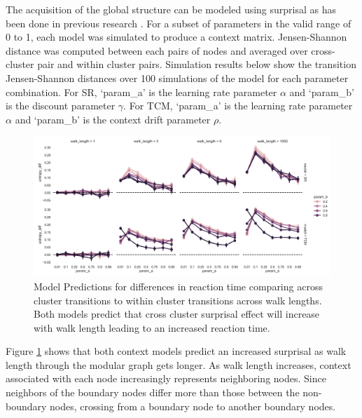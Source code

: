 The acquisition of the global structure can be modeled using surprisal as has been done in previous research \cite{lynn2020abstract,lynn2020humans,lynn2020human}. For a subset of parameters in the valid range of 0 to 1, each model was simulated to produce a context matrix. Jensen-Shannon distance was computed between each pairs of nodes and averaged over cross-cluster pair and within cluster pairs. Simulation results below show the transition Jensen-Shannon distances over 100 simulations of the model for each parameter combination. For SR, `param\_a' is the learning rate parameter $\alpha$ and `param\_b' is the discount parameter $\gamma$. For TCM, `param\_a' is the learning rate parameter $\alpha$ and `param\_b' is the context drift parameter $\rho$. 
\begin{figure}
	\centering
	\label{fig:SR-TCM-walklength-transition-sjdist}
	\includegraphics[width = \textwidth]{chapter_notebooks/chapter_2/figures/SR_TCM_boundary_nonboundary_jsdist.png}
	\caption{Model Predictions for differences in reaction time comparing across cluster transitions to within cluster transitions across walk lengths. Both models predict that cross cluster surprisal effect will increase with walk length leading to an increased reaction time.}
\end{figure}

Figure \ref{fig:SR-TCM-walklength-transition-sjdist} shows that both context models predict an increased surprisal as walk length through the modular graph gets longer. As walk length increases, context associated with each node increasingly represents neighboring nodes. Since neighbors of the boundary nodes differ more than those between the non-boundary nodes, crossing from a boundary node to another boundary nodes.

